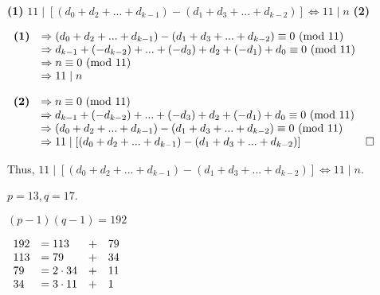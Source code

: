 \documentclass[a4paper, 11pt]{article}
\begin{document}
\begin{myEnumerate}
    \centerline{\textbf{(1)} $11 \mid [(d_{0} + d_{2} + ... + d_{k - 1}) - (d_{1} + d_{3} + ... + d_{k - 2})] \Leftrightarrow 11 \mid n$ \textbf{(2)}}
    
    \( \\
    \begin{array}{ll}
     	\textbf{(1)} & \Rightarrow (d_{0} + d_{2} + ... + d_{k - 1}) - (d_{1} + d_{3} + ... + d_{k - 2}) \equiv 0 $ $ ($mod $ 11) \\
        			 & \Rightarrow d_{k - 1} + (-d_{k - 2}) + ... + (-d_{3}) + d_{2} + (-d_{1}) + d_{0} \equiv 0 $ $ ($mod $ 11) \\
                     & \Rightarrow n \equiv 0 $ $ ($mod $ 11) \\
                     & \Rightarrow 11 \mid n
    \end{array} \\ \)
    
    \( \\
    \begin{array}{lll}
     	\textbf{(2)} & \Rightarrow n \equiv 0 $ $ ($mod $ 11) \\
        			 & \Rightarrow d_{k - 1} + (-d_{k - 2}) + ... + (-d_{3}) + d_{2} + (-d_{1}) + d_{0} \equiv 0 $ $ ($mod $ 11) \\
                     & \Rightarrow (d_{0} + d_{2} + ... + d_{k - 1}) - (d_{1} + d_{3} + ... + d_{k - 2}) \equiv 0 $ $ ($mod $ 11) \\
                     & \Rightarrow 11 \mid [(d_{0} + d_{2} + ... + d_{k - 1}) - (d_{1} + d_{3} + ... + d_{k - 2})] $ $ & \square
    \end{array} \\ \)
    
    Thus, $11 \mid [(d_{0} + d_{2} + ... + d_{k - 1}) - (d_{1} + d_{3} + ... + d_{k - 2})] \Leftrightarrow 11 \mid n$.

    \item
    \begin{myEnumerate}
    	\item
        $p = 13, q = 17$.
        
        \item
        $(p - 1)(q - 1) = 192$
        
        \( \\
        \begin{array}{llll}
        	192 & = 113 & + & 79 \\
            113 & = 79 & + & 34 \\
            79 & = 2 \cdot 34 & + & 11 \\
            34 & = 3 \cdot 11 & + & 1 \\
        \end{array} \\ \)
        

\end{myEnumerate}
\end{myEnumerate}
\end{document}
